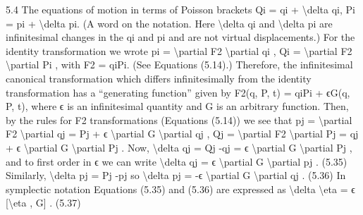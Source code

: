 5.4
The equations of motion in terms of Poisson brackets
Qi = qi + \textbackslash{}delta qi,
Pi = pi + \textbackslash{}delta pi.
(A word on the notation. Here \textbackslash{}delta qi and \textbackslash{}delta pi are infinitesimal changes in the qi
and pi and are not virtual displacements.)
For the identity transformation we wrote
pi = \textbackslash{}partial F2
\textbackslash{}partial qi
,
Qi = \textbackslash{}partial F2
\textbackslash{}partial Pi
,
with F2 =
qiPi. (See Equations (5.14).) Therefore, the infinitesimal canonical transformation which differs infinitesimally from the identity transformation has a ``generating function'' given by
F2(q, P, t) =
qiPi + ϵG(q, P, t),
where ϵ is an infinitesimal quantity and G is an arbitrary function. Then, by
the rules for F2 transformations (Equations (5.14)) we see that
pj = \textbackslash{}partial F2
\textbackslash{}partial qj
= Pj + ϵ \textbackslash{}partial G
\textbackslash{}partial qj
,
Qj = \textbackslash{}partial F2
\textbackslash{}partial Pj
= qj + ϵ \textbackslash{}partial G
\textbackslash{}partial Pj
.
Now,
\textbackslash{}delta qj = Qj -qj = ϵ \textbackslash{}partial G
\textbackslash{}partial Pj
,
and to first order in ϵ we can write
\textbackslash{}delta qj = ϵ \textbackslash{}partial G
\textbackslash{}partial pj
.
(5.35)
Similarly, \textbackslash{}delta pj = Pj -pj so
\textbackslash{}delta pj = -ϵ \textbackslash{}partial G
\textbackslash{}partial qj
.
(5.36)
In symplectic notation Equations (5.35) and (5.36) are expressed as
\textbackslash{}delta \textbackslash{}eta  = ϵ [\textbackslash{}eta , G] .
(5.37)

